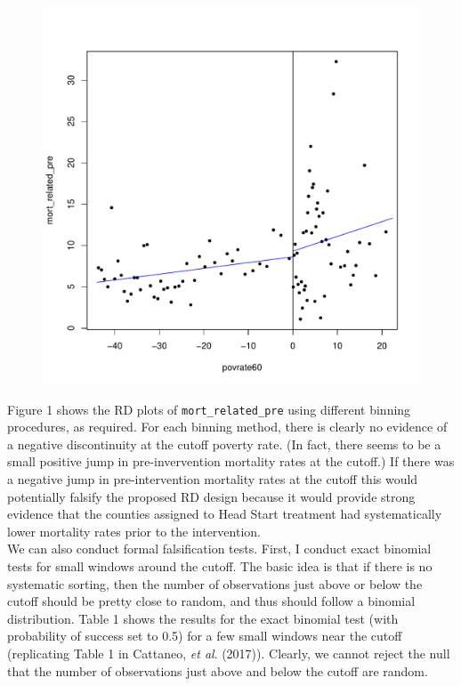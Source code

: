 \documentclass[12pt]{article}
\begin{document}
\begin{figure}[htpb!]
\begin{minipage}{0.5\textwidth}
    \end{minipage}\hfill
    \begin{minipage}{0.5\textwidth}
        \includegraphics[width=1\textwidth]{q2-1-qsmv.pdf}
    \end{minipage}
\end{figure}

Figure 1 shows the RD plots of \verb|mort_related_pre| using different binning procedures, as required. For each binning method, there is clearly no evidence of a negative discontinuity at the cutoff poverty rate. (In fact, there seems to be a small positive jump in pre-invervention mortality rates at the cutoff.) If there was a negative jump in pre-intervention mortality rates at the cutoff this would potentially falsify the proposed RD design because it would provide strong evidence that the counties assigned to Head Start treatment had systematically lower mortality rates prior to the intervention.\\

We can also conduct formal falsification tests. First, I conduct exact binomial tests for small windows around the cutoff. The basic idea is that if there is no systematic sorting, then the number of observations just above or below the cutoff should be pretty close to random, and thus should follow a binomial distribution. Table 1 shows the results for the exact binomial test (with probability of success set to 0.5) for a few small windows near the cutoff (replicating Table 1 in Cattaneo, \textit{et al}. (2017)). Clearly, we cannot reject the null that the number of observations just above and below the cutoff are random.
\end{document}
